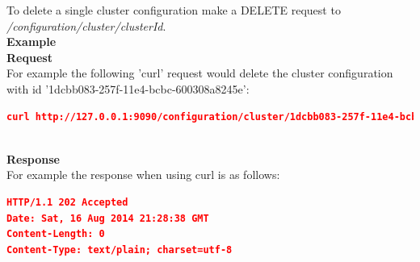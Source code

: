\documentclass[a4paper,11pt,twoside]{article}
\begin{document}
\noindent 
To delete a single cluster configuration make a DELETE request to \textit{/configuration/cluster/{clusterId}}.\\

\noindent 
\textbf{Example}\\

\noindent 
\textbf{Request}\\

\noindent 
For example the following 'curl' request would delete the cluster configuration with id '1dcbb083-257f-11e4-bcbc-600308a8245e':\\

\begin{lstlisting}[language=json,firstnumber=1]
curl http://127.0.0.1:9090/configuration/cluster/1dcbb083-257f-11e4-bcbc-600308a8245e -X DELETE
\end{lstlisting}

\noindent \\
\textbf{Response}\\

\noindent 
For example the response when using curl is as follows:

\begin{lstlisting}[language=json,firstnumber=1]
HTTP/1.1 202 Accepted
Date: Sat, 16 Aug 2014 21:28:38 GMT
Content-Length: 0
Content-Type: text/plain; charset=utf-8
\end{lstlisting}
\end{document}
